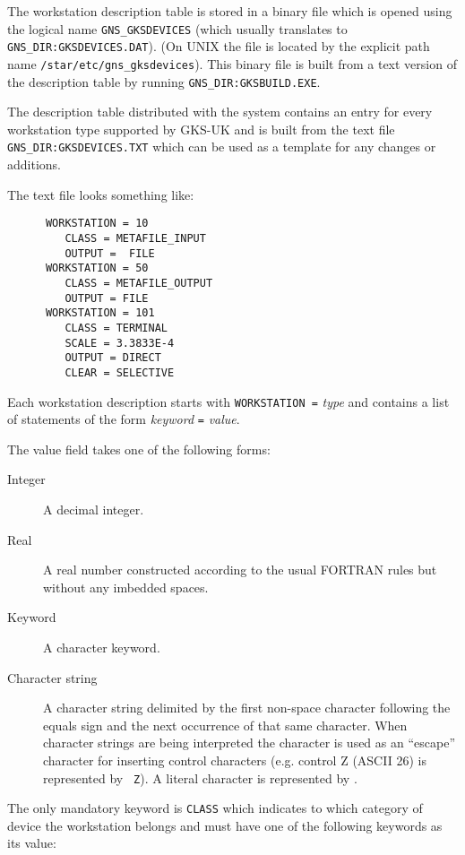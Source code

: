 The workstation description table is stored in a binary file which is opened
using the logical name {\tt GNS\_GKSDEVICES} (which usually translates to {\tt
GNS\_DIR:GKSDEVICES.DAT}). (On UNIX the file is located by the explicit
path name {\tt /star/etc/gns\_gksdevices}).
This binary file is built from a text version of the
description table by running {\tt GNS\_DIR:GKSBUILD.EXE}.

The description table distributed with the system contains an entry for every
workstation type supported by GKS-UK and is built from the text file {\tt
GNS\_DIR:GKSDEVICES.TXT} which can be used as a template for any changes or
additions.

The text file looks something like:

\begin{verbatim}
      WORKSTATION = 10
         CLASS = METAFILE_INPUT
         OUTPUT =  FILE
      WORKSTATION = 50
         CLASS = METAFILE_OUTPUT
         OUTPUT = FILE
      WORKSTATION = 101
         CLASS = TERMINAL
         SCALE = 3.3833E-4
         OUTPUT = DIRECT
         CLEAR = SELECTIVE
\end{verbatim}

Each workstation description starts with {\tt WORKSTATION =} {\em type} and
contains a list of statements of the form {\em keyword} {\tt =} {\em value}.

The value field takes one of the following forms:
\begin{description}
\item[Integer] A decimal integer.
\item[Real] A real number constructed according to the usual FORTRAN rules but
without any imbedded spaces.
\item[Keyword] A character keyword.
\item[Character string] A character string delimited by the first non-space 
character following the equals sign and the next occurrence of that same 
character.
When character strings are being interpreted the {\tt{}} character is used
as an ``escape'' character for inserting control characters (e.g. control Z
(ASCII 26) is represented by {\tt{} Z}). A literal {\tt{}} character
is represented by {\tt{}}.
\end{description}

The only mandatory keyword is {\tt CLASS} which indicates to which category of
device the workstation belongs and must have one of the following
keywords as its value:

